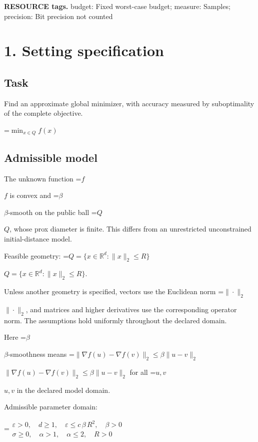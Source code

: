 \documentclass[10pt,a4paper]{article}
\newcommand{\AtlasMath}[1]{\par\begingroup\centering\setbox0=\hbox{$\displaystyle #1$}\ifdim\wd0>1.4\linewidth\typeout{ATLAS WIDE FORMULA: \the\wd0}\fi\ifdim\wd0>\linewidth\resizebox{\linewidth}{!}{\box0}\else\box0\fi\par\endgroup}
\newcommand{\AtlasInlineMath}[1]{\begingroup\setbox0=\hbox{$#1$}\ifdim\wd0>.4\linewidth\endgroup\AtlasMath{#1}\else\endgroup$#1$\fi}
\begin{document}
\textbf{RESOURCE tags.} budget: Fixed worst-case budget; measure: Samples; precision: Bit precision not counted



\section{1. Setting specification}


\subsection{Task}


Find an approximate global minimizer, with accuracy measured by suboptimality of the complete objective.




\AtlasMath{\min_{x\in Q}f(x)}




\subsection{Admissible model}


The unknown function \AtlasInlineMath{f} is convex and \AtlasInlineMath{\beta}-smooth on the public ball \AtlasInlineMath{Q}, whose prox diameter is finite. This differs from an unrestricted unconstrained initial-distance model.



Feasible geometry: \AtlasInlineMath{Q=\{x\in\mathbb{R}^d:\|x\|_2\le R\}}.



Unless another geometry is specified, vectors use the Euclidean norm \AtlasInlineMath{\|\cdot\|_2}, and matrices and higher derivatives use the corresponding operator norm. The assumptions hold uniformly throughout the declared domain.



Here \AtlasInlineMath{\beta}-smoothness means \AtlasInlineMath{\|\nabla f(u)-\nabla f(v)\|_2\le\beta\|u-v\|_2} for all \AtlasInlineMath{u,v} in the declared model domain.



Admissible parameter domain:


\AtlasMath{\begin{gathered}\varepsilon > 0,\quad d \ge 1,\quad \varepsilon \le c\,\beta\,{R}^{2},\quad \beta > 0\\\sigma \ge 0,\quad \alpha > 1,\quad \alpha \le 2,\quad R > 0\end{gathered}}
\end{document}

